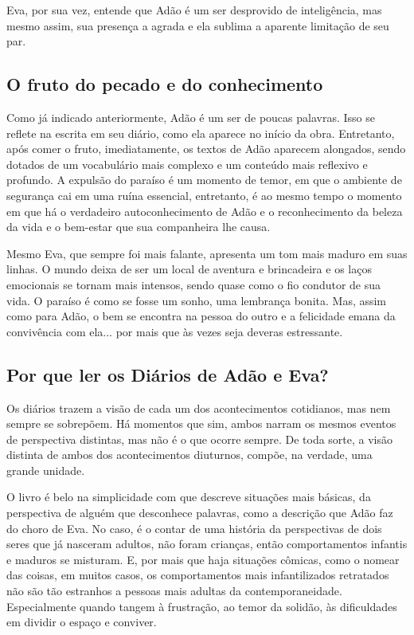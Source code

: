 \documentclass[12pt]{extarticle}
\begin{document}
Eva, por sua vez, entende que Adão é um ser desprovido de inteligência,
mas mesmo assim, sua presença a agrada e ela sublima a aparente
limitação de seu par.


\subsection{O fruto do pecado e do conhecimento}

Como já indicado anteriormente, Adão é um ser de poucas palavras. Isso
se reflete na escrita em seu diário, como ela aparece no início da obra.
Entretanto, após comer o fruto, imediatamente, os textos de Adão
aparecem alongados, sendo dotados de um vocabulário mais complexo e um
conteúdo mais reflexivo e profundo. A expulsão do paraíso é um momento
de temor, em que o ambiente de segurança cai em uma ruína essencial,
entretanto, é ao mesmo tempo o momento em que há o verdadeiro
autoconhecimento de Adão e o reconhecimento da beleza da vida e o
bem-estar que sua companheira lhe causa.

Mesmo Eva, que sempre foi mais falante, apresenta um tom mais maduro em
suas linhas. O mundo deixa de ser um local de aventura e brincadeira e
os laços emocionais se tornam mais intensos, sendo quase como o fio
condutor de sua vida. O paraíso é como se fosse um sonho, uma lembrança
bonita. Mas, assim como para Adão, o bem se encontra na pessoa do outro
e a felicidade emana da convivência com ela... por mais que às vezes
seja deveras estressante.

\subsection{Por que ler os Diários de Adão e Eva?}

Os diários trazem a visão de cada um dos acontecimentos cotidianos, mas
nem sempre se sobrepõem. Há momentos que sim, ambos narram os mesmos
eventos de perspectiva distintas, mas não é o que ocorre sempre. De toda
sorte, a visão distinta de ambos dos acontecimentos diuturnos, compõe,
na verdade, uma grande unidade.

O livro é belo na simplicidade com que descreve situações mais básicas,
da perspectiva de alguém que desconhece palavras, como a descrição que
Adão faz do choro de Eva. No caso, é o contar de uma história da
perspectivas de dois seres que já nasceram adultos, não foram crianças,
então comportamentos infantis e maduros se misturam. E, por mais que
haja situações cômicas, como o nomear das coisas, em muitos casos, os
comportamentos mais infantilizados retratados não são tão estranhos a
pessoas mais adultas da contemporaneidade. Especialmente quando tangem à
frustração, ao temor da solidão, às dificuldades em dividir o espaço e
conviver.
\end{document}
